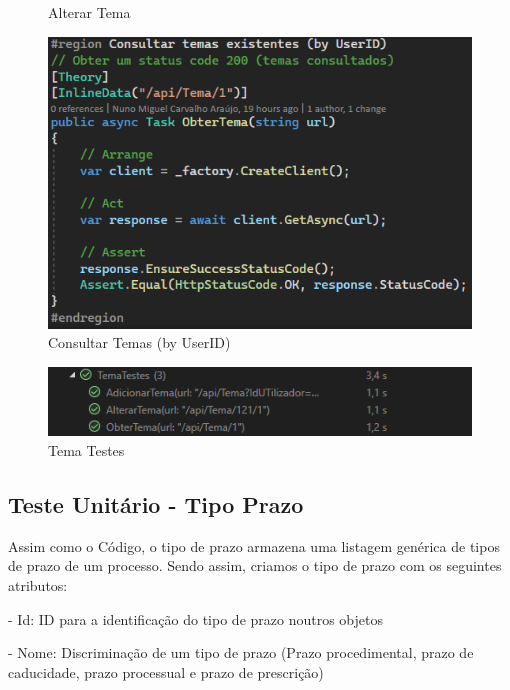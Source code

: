 \begin{figure}[!htbp]
\begin{minipage}[b]{0.4\textwidth}
    \caption{Alterar Tema}
    \label{d.unitario}
  \end{minipage}
  \centering
  \begin{minipage}[b]{0.4\textwidth}
    \includegraphics[width=\textwidth]{Figuras/TestesUnitarios/Tema/Consultar temas existentes (by User ID).png}
    \caption{Consultar Temas (by UserID)}
    \label{d.unitario}
  \end{minipage}
\end{figure}

\begin{figure}[!tbp]
\centering
\includegraphics[width=1\textwidth]{Figuras/Testes/TemaTestes.png}
\caption{Tema Testes}
\label{d.teste}
\end{figure}

\newpage


\subsection{Teste Unitário - Tipo Prazo}
\indent \par Assim como o Código, o tipo de prazo armazena uma listagem genérica de tipos de prazo de um processo. Sendo assim, criamos o tipo de prazo com os seguintes atributos:
\indent \par - Id: ID para a identificação do tipo de prazo noutros objetos
\indent \par - Nome: Discriminação de um tipo de prazo (Prazo procedimental, prazo de caducidade, prazo processual e prazo de prescrição)

